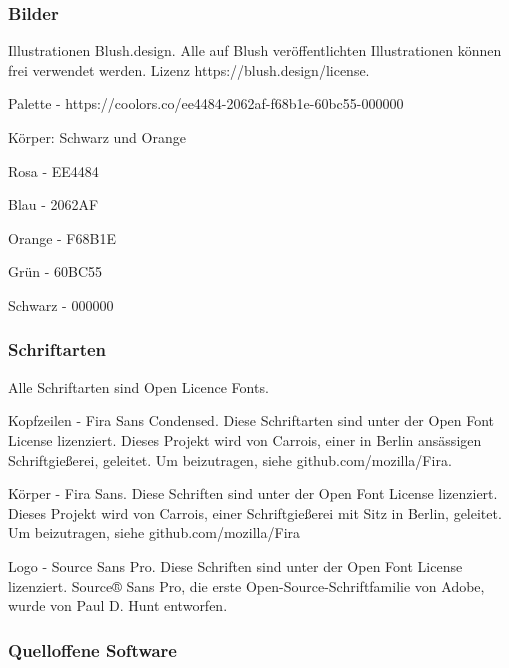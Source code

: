 \documentclass{article}
\begin{document}
\subsubsection{Bilder}\label{H8994266}



Illustrationen Blush.design. Alle auf Blush veröffentlichten Illustrationen können frei verwendet werden. Lizenz https://blush.design/license.


Palette - https://coolors.co/ee4484-2062af-f68b1e-60bc55-000000


Körper: Schwarz und Orange


Rosa - EE4484


Blau - 2062AF


Orange - F68B1E


Grün - 60BC55


Schwarz - 000000


\subsubsection{Schriftarten}\label{H8602637}



Alle Schriftarten sind Open Licence Fonts.


Kopfzeilen - Fira Sans Condensed. Diese Schriftarten sind unter der Open Font License lizenziert. Dieses Projekt wird von Carrois, einer in Berlin ansässigen Schriftgießerei, geleitet. Um beizutragen, siehe github.com/mozilla/Fira.


Körper - Fira Sans. Diese Schriften sind unter der Open Font License lizenziert. Dieses Projekt wird von Carrois, einer Schriftgießerei mit Sitz in Berlin, geleitet. Um beizutragen, siehe github.com/mozilla/Fira


Logo - Source Sans Pro. Diese Schriften sind unter der Open Font License lizenziert. Source® Sans Pro, die erste Open-Source-Schriftfamilie von Adobe, wurde von Paul D. Hunt entworfen.


\subsubsection{Quelloffene Software}\label{H1183783}
\end{document}
